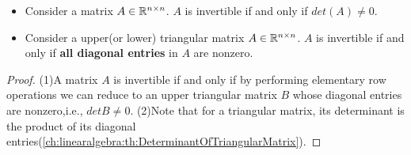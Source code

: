 \begin{refsection}
\begin{lemma}\hfill
\begin{itemize}
	\item Consider a matrix $A\in \mathbb{R}^{n\times n}$. $A$ is invertible if and only if $det(A) \neq 0$.
	\item Consider a upper(or lower) triangular matrix $A\in \mathbb{R}^{n\times n}$. $A$ is invertible if and only if \textbf{all diagonal entries} in $A$ are nonzero.
\end{itemize}	
\end{lemma}
\begin{proof}
(1)A matrix $A$ is invertible if and only if by performing elementary row operations we can reduce to an upper triangular matrix $B$ whose diagonal entries are nonzero,i.e., $det B \neq 0$.
(2)Note that for a triangular matrix, its determinant is the product of its diagonal entries(\autoref{ch:linearalgebra:th:DeterminantOfTriangularMatrix}). 
\end{proof}


\end{refsection}
